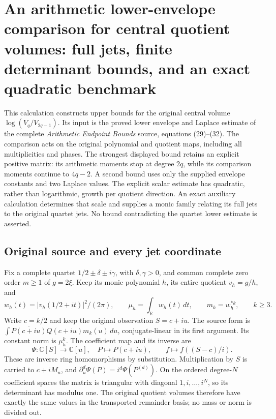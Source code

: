\begingroup
\def\C{\mathbb C}
\def\R{\mathbb R}
\def\Tr{\operatorname{Tr}}
\def\diag{\operatorname{diag}}
\section{An arithmetic lower-envelope comparison for central quotient volumes: full jets, finite determinant bounds, and an exact quadratic benchmark}



This calculation constructs upper bounds for the original central volume
$\log(V_q/V_{2q-1})$. Its input is the proved lower envelope and Laplace
estimate of the complete \emph{Arithmetic Endpoint Bounds} source, equations
(29)--(32). The comparison acts on the original polynomial and quotient
maps, including all multiplicities and phases. The strongest displayed
bound retains an explicit positive matrix: its arithmetic moments stop at
degree $2q$, while its comparison moments continue to $4q-2$. A second
bound uses only the supplied envelope constants and two Laplace values.
The explicit scalar estimate has quadratic, rather than logarithmic,
growth per quotient direction. An exact auxiliary calculation determines
that scale and supplies a monic family relating its full jets to the
original quartet jets. No bound contradicting the quartet lower estimate
is asserted.

\subsection{Original source and every jet coordinate}

Fix a complete quartet $1/2\pm\delta\pm i\gamma$, with
$\delta,\gamma>0$, and common complete zero order $m\ge1$ of $g=2\xi$.
Keep its monic polynomial $h$, its entire quotient $v_h=g/h$, and
\[
 w_h(t)=|v_h(1/2+it)|^2/(2\pi),\qquad
 \mu_h=\int_\R w_h(t)\,dt,\qquad m_k=w_h^{*k},\qquad k\ge3.
 \tag{AU.1}
\]
Write $c=k/2$ and keep the original observation $S=c+iu$. The source
form is $\int\overline{P(c+iu)}Q(c+iu)m_k(u)\,du$, conjugate-linear
in its first argument. Its constant norm is $\mu_h^k$.
The coefficient map and its inverse are
\[
 \Psi:\C[S]\longrightarrow\C[u],\quad P\longmapsto P(c+iu),
 \qquad f\longmapsto f((S-c)/i).                             \tag{AU.2}
\]
These are inverse ring homomorphisms by substitution. Multiplication by
$S$ is carried to $c+iM_u$, and
$\partial_u^d\Psi(P)=i^d\Psi(P^{(d)})$. On the ordered degree-$N$
coefficient spaces the matrix is triangular with diagonal
$1,i,\ldots,i^N$, so its determinant has modulus one. The original
quotient volumes therefore have exactly the same values in the
transported remainder basis; no mass or norm is divided out.

